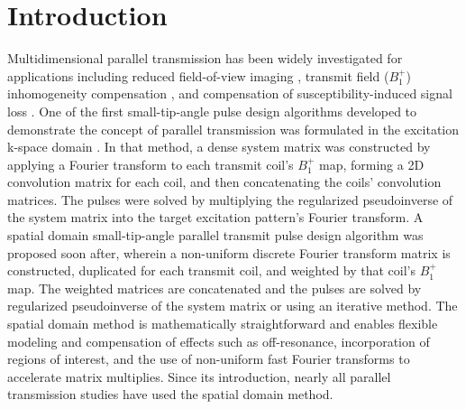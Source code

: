 \section* {Introduction}

\par Multidimensional parallel transmission \cite{Katscher:2003:Magn-Reson-Med:12509830,zhu2004parallel} has been widely investigated for applications including
reduced field-of-view imaging \cite{malik:mrm:2015,mooiweer:2016},
transmit field ($B_1^+$) inhomogeneity compensation \cite{Zhang:2007:Magn-Reson-Med:16526012,cloos:kpstd:2012},
and compensation of susceptibility-induced signal loss \cite{deng:2009}.
One of the first small-tip-angle pulse design algorithms developed to demonstrate the concept of parallel transmission was formulated in the 
excitation k-space domain \cite{Katscher:2003:Magn-Reson-Med:12509830}.
In that method, a dense system matrix was constructed by applying a Fourier transform to each transmit coil's $B_1^+$ map,
forming a 2D convolution matrix for each coil, and then concatenating the coils' convolution matrices.
The pulses were solved by multiplying the 
regularized pseudoinverse of the system matrix into the target excitation pattern's Fourier transform. 
A spatial domain small-tip-angle parallel transmit pulse design algorithm 
\cite{Grissom:2006:MRM} was proposed soon after,
wherein a non-uniform discrete Fourier transform matrix is constructed, 
duplicated for each transmit coil, and weighted by that coil's $B_1^+$ map.
The weighted matrices are concatenated and the pulses are solved by regularized pseudoinverse of the system matrix
or using an iterative method.
% 
The spatial domain method is mathematically straightforward 
and enables flexible modeling and compensation of effects such as off-resonance, 
incorporation of regions of interest,
and the use of non-uniform fast Fourier transforms to accelerate matrix multiplies.
Since its introduction, nearly all parallel transmission studies have used the spatial domain method. 


